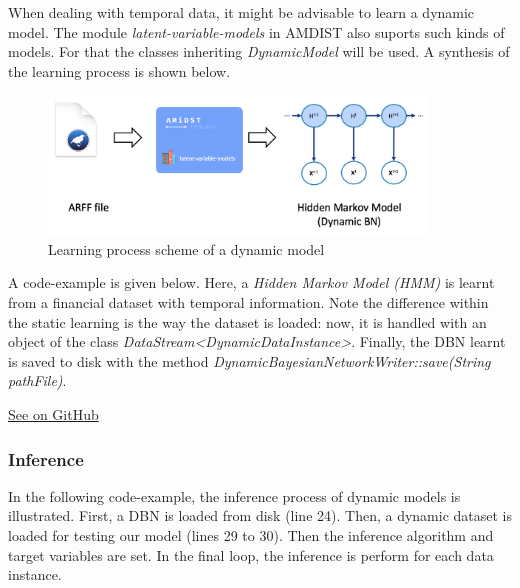 \documentclass[10pt,a4paper]{article}
\begin{document}
When dealing with temporal data, it might be advisable to learn a dynamic model. The module \textit{latent-variable-models} in AMDIST also suports such kinds of models. For that the classes inheriting \textit{DynamicModel} will be used. A synthesis of the learning process is shown below.\newline 



\begin{figure}[h!]
	\centering
	\includegraphics[width=10cm]{img/dynamicLearning.png}
	\caption{Learning process scheme of a dynamic model}
	\label{fig:lvmodels:dynamic:learning:scheme}	
\end{figure}


A code-example is given below. Here, a \textit{Hidden Markov Model (HMM)} is learnt from a financial dataset with temporal information. Note the difference within the static learning is the way the dataset is loaded: now, it is handled with an object of the class \textit{DataStream<DynamicDataInstance>}. Finally, the DBN learnt is saved to disk with the method \textit{DynamicBayesianNetworkWriter::save(String pathFile)}.\newline 


\href{https://github.com/amidst/tutorial/blob/master/src/main/java/eu/amidst/tutorial/usingAmidst/examples/DynamicModelLearning.java}{See on GitHub}

\subsubsection{Inference}

In the following code-example, the inference process of dynamic models is illustrated. First, a DBN is loaded from disk (line 24). Then, a dynamic dataset is loaded for testing our model (lines 29 to 30). Then the inference algorithm and target variables are set. In the final loop, the inference is perform for each data instance.\newline 
\end{document}

